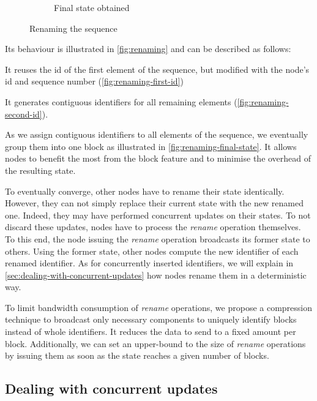 \documentclass[sigplan,10pt]{acmart}
\begin{document}
\begin{figure}[ht!]
\begin{subfigure}{\columnwidth}
        \caption{Final state obtained}
        \label{fig:renaming-final-state}
    \end{subfigure}
    \caption{Renaming the sequence}
    \label{fig:renaming}
\end{figure}

Its behaviour is illustrated in \autoref{fig:renaming} and can be described as follows:
\begin{enumerate*}
    \item It reuses the id of the first element of the sequence, but modified with the node's id and sequence number (\autoref{fig:renaming-first-id})
    \item It generates contiguous identifiers for all remaining elements (\autoref{fig:renaming-second-id}).
\end{enumerate*}
As we assign contiguous identifiers to all elements of the sequence, we eventually group them into one block as illustrated in \autoref{fig:renaming-final-state}.
It allows nodes to benefit the most from the block feature and to minimise the overhead of the resulting state.

To eventually converge, other nodes have to rename their state identically.
However, they can not simply replace their current state with the new renamed one.
Indeed, they may have performed concurrent updates on their states.
To not discard these updates, nodes have to process the \emph{rename} operation themselves.
To this end, the node issuing the \emph{rename} operation broadcasts its former state to others.
Using the former state, other nodes compute the new identifier of each renamed identifier.
As for concurrently inserted identifiers, we will explain in \autoref{sec:dealing-with-concurrent-updates} how nodes rename them in a deterministic way.

To limit bandwidth consumption of \emph{rename} operations, we propose a compression technique to broadcast only necessary components to uniquely identify blocks instead of whole identifiers.
It reduces the data to send to a fixed amount per block.
Additionally, we can set an upper-bound to the size of \emph{rename} operations by issuing them as soon as the state reaches a given number of blocks.

\subsection{Dealing with concurrent updates}
\end{document}
